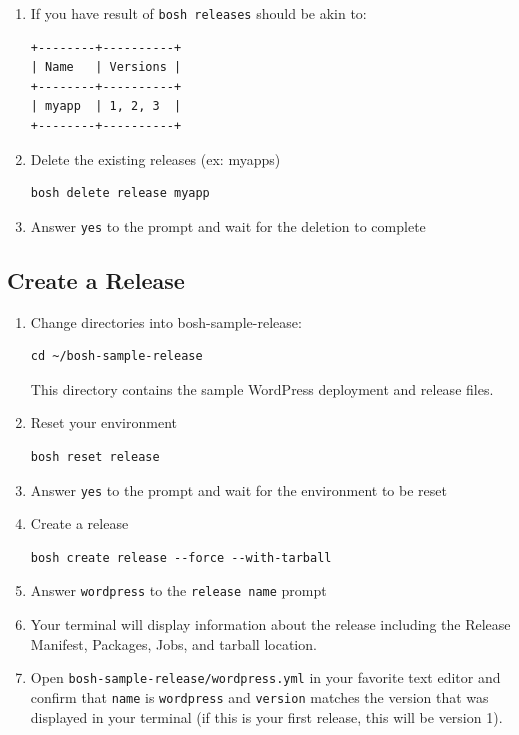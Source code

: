\begin{enumerate}
\item If you have result of \texttt{bosh releases} should be akin to:

\begin{verbatim}
+--------+----------+
| Name   | Versions |
+--------+----------+
| myapp  | 1, 2, 3  |
+--------+----------+
\end{verbatim}


\item Delete the existing releases (ex: myapps) 

\begin{verbatim}
bosh delete release myapp 
\end{verbatim}


\item Answer \texttt{yes} to the prompt and wait for the deletion to complete

\end{enumerate}

\subsection{Create a Release}
\label{createarelease}

\begin{enumerate}
\item Change directories into bosh-sample-release:

\begin{verbatim}
cd ~/bosh-sample-release
\end{verbatim}


This directory contains the sample WordPress deployment and release files. 

\item Reset your environment

\begin{verbatim}
bosh reset release
\end{verbatim}


\item Answer \texttt{yes} to the prompt and wait for the environment to be reset

\item Create a release

\begin{verbatim}
bosh create release --force --with-tarball
\end{verbatim}


\item Answer \texttt{wordpress} to the \texttt{release name} prompt

\item Your terminal will display information about the release including the Release Manifest, Packages, Jobs, and tarball location.

\item Open \texttt{bosh-sample-release\slash wordpress.yml} in your favorite text editor and confirm that \texttt{name} is \texttt{wordpress} and \texttt{version} matches the version that was displayed in your terminal (if this is your first release, this will be version 1).

\end{enumerate}

